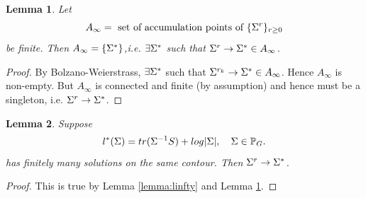 \documentclass[12pt, leqno]{article}
\providecommand{\abs}[1]{\lvert#1\rvert}
\def\s{\ensuremath\Sigma}
\def\pg{\ensuremath\mathbb{P}_{{G}}}
\newtheorem{lemma}{Lemma}[]
\begin{document}
\begin{lemma} \label{lemma:singleton}
Let 
\[
A_{\infty} = \text{ set of accumulation points of } \{\s^r\}_{r \geq 0}
\]
be finite. Then $A_{\infty} = \{\s^*\}$,i.e. $\exists \s^*$ such that $\s^r \to \s^* \in A_{\infty}$.
\end{lemma}
\begin{proof}
By Bolzano-Weierstrass, $\exists \s^*$ such that $\s^{r_k} \to \s^*
\in A_{\infty}$. Hence $A_{\infty}$ is non-empty. But $A_{\infty}$ is connected and finite (by assumption) and hence must
be a singleton, i.e. $\s^r \to \s^*$.
\end{proof}
\begin{lemma}
Suppose 
\[
l^*(\s) = tr(\s^{-1} S) + log \abs{\s}, \quad \s \in \pg.
\]  
has finitely many solutions on the same contour. Then $\s^r \to \s^*$.
\end{lemma}
\begin{proof}
This is true by Lemma \ref{lemma:linfty} and Lemma \ref{lemma:singleton}.
\end{proof}
\end{document}
